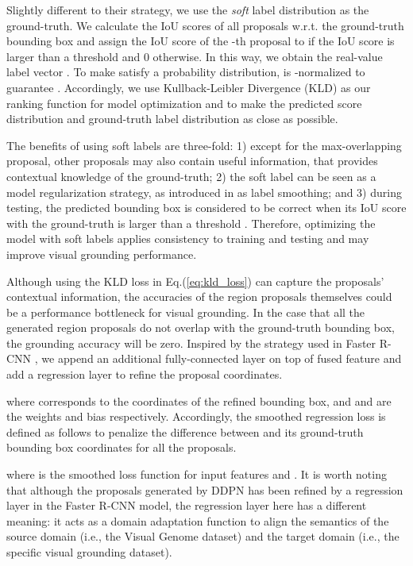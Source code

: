 \documentclass{article}
\begin{document}
Slightly different to their strategy, we use the \emph{soft} label distribution as the ground-truth. We calculate the IoU scores of all proposals w.r.t. the ground-truth bounding box and assign the IoU score of the -th proposal to  if the IoU score is larger than a threshold  and 0 otherwise. In this way, we obtain the real-value label vector . To make  satisfy a probability distribution,  is -normalized to guarantee . Accordingly, we use Kullback-Leibler Divergence (KLD) as our ranking function for model optimization and to make the predicted score distribution  and ground-truth label distribution  as close as possible.


The benefits of using {soft} labels are three-fold: 1) except for the max-overlapping proposal, other proposals may also contain useful information, that provides contextual knowledge of the ground-truth; 2) the soft label can be seen as a model regularization strategy, as introduced in \cite{szegedy2016rethinking} as label smoothing; and 3) during testing, the predicted bounding box is considered to be correct when its IoU score with the ground-truth is larger than a threshold . Therefore, optimizing the model with soft labels applies consistency to training and testing and may improve visual grounding performance.

Although using the KLD loss in Eq.(\ref{eq:kld_loss}) can capture the proposals' contextual information, the accuracies of the region proposals themselves could be a performance bottleneck for visual grounding. In the case that all the generated region proposals do not overlap with the ground-truth bounding box, the grounding accuracy will be zero. Inspired by the strategy used in Faster R-CNN \cite{ren2015faster}, we append an additional fully-connected layer on top of fused feature  and add a regression layer to refine the proposal coordinates.

where  corresponds to the coordinates of the refined bounding box, and  and  are the weights and bias respectively. Accordingly, the smoothed  regression loss is defined as follows to penalize the difference between  and its ground-truth bounding box coordinates  for all the proposals.

where  is the smoothed  loss function for input features  and  \cite{ren2015faster}.
It is worth noting that although the proposals generated by DDPN has been refined by a regression layer in the Faster R-CNN model, the regression layer here has a different meaning: it acts as a domain adaptation function to align the semantics of the source domain (i.e., the Visual Genome dataset) and the target domain (i.e., the specific visual grounding dataset).
\end{document}
